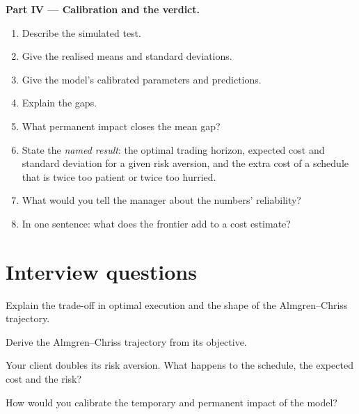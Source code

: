 \begin{problem}
\medskip\noindent\textbf{Part IV --- Calibration and the verdict.}
\begin{enumerate}[resume]
\item Describe the simulated test.
\item Give the realised means and standard deviations.
\item Give the model's calibrated parameters and predictions.
\item Explain the gaps.
\item What permanent impact closes the mean gap?
\item State the \emph{named result}: the optimal trading horizon, expected cost and standard deviation for a given risk aversion, and the extra cost of a
schedule that is twice too patient or twice too hurried.
\item What would you tell the manager about the numbers' reliability?
\item In one sentence: what does the frontier add to a cost estimate?
\end{enumerate}
\end{problem}

\section{Interview questions}

\begin{interviewq}\label{iq:mx:the-almgren-chriss-framework:1}
Explain the trade-off in optimal execution and the shape of the Almgren--Chriss trajectory.
\end{interviewq}

\begin{interviewq}\label{iq:mx:the-almgren-chriss-framework:2}
Derive the Almgren--Chriss trajectory from its objective.
\end{interviewq}

\begin{interviewq}\label{iq:mx:the-almgren-chriss-framework:3}
Your client doubles its risk aversion. What happens to the schedule, the expected cost and the risk?
\end{interviewq}

\begin{interviewq}\label{iq:mx:the-almgren-chriss-framework:4}
How would you calibrate the temporary and permanent impact of the model?
\end{interviewq}

